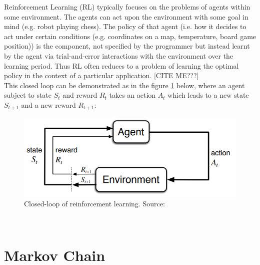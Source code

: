 Reinforcement Learning (RL) typically focuses on the problems of agents within some environment. The agents can act upon the environment with some goal in mind (e.g. robot playing chess). The policy of that agent (i.e. how it decides to act under certain conditions (e.g. coordinates on a map, temperature, board game position)) is the component, not specified by the programmer but instead learnt by the agent via trial-and-error interactions with the environment over the learning period. Thus RL often reduces to a problem of learning the optimal policy in the context of a particular application. [CITE ME???] \\

This closed loop can be demonstrated as in the figure \ref{fig:closed_loop} below, where an agent subject to state $S_{t}$
and reward $R_{t}$ takes an action $A_{t}$ which leads to a new
state $S_{t+1}$ and a new reward $R_{t+1}$:

\begin{figure}[h!]
  \centering
  \includegraphics[scale=0.7]{figures/closed_loop.PNG}
  \caption{Closed-loop of reinforcement learning. Source: \cite{sutton_barto}}
  \label{fig:closed_loop}
\end{figure}\\  


 
\section{Markov Chain}

